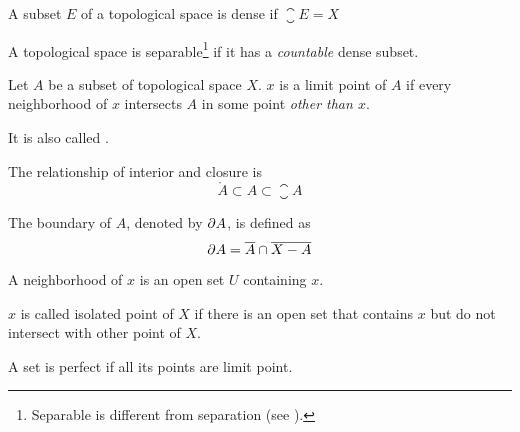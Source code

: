 \begin{definition}
    A subset $E$ of a topological space is dense if $\closure{E} = X$
\end{definition}

\begin{definition}\label{separable}
    A topological space is separable\footnote{Separable is different from separation (see ).} if it has a \emph{countable} dense subset.
\end{definition}


\begin{definition}
    Let $A$ be a subset of topological space $X$. $x$ is a limit point of $A$ if every neighborhood of $x$ intersects $A$ in some point \emph{other than $x$}.
    
    It is also called .
\end{definition}


\begin{theorem}
    The relationship of interior and closure is
\begin{equation}
    \mathring{A} \subset A \subset \closure{A}
\end{equation}
\end{theorem}



\begin{definition}
    The boundary of $A$, denoted by $\partial A$, is defined as
    \begin{equation}
        \partial A = \overline{A} \cap \overline{X - A}
    \end{equation}
\end{definition}


\begin{definition}
    A neighborhood of $x$ is an open set $U$ containing $x$.
\end{definition}


\begin{definition}
    $x$ is called isolated point of $X$ if there is an open set that contains $x$ but do not intersect with other point of $X$.
\end{definition}

\begin{definition}
    A set is perfect if all its points are limit point.
\end{definition}

